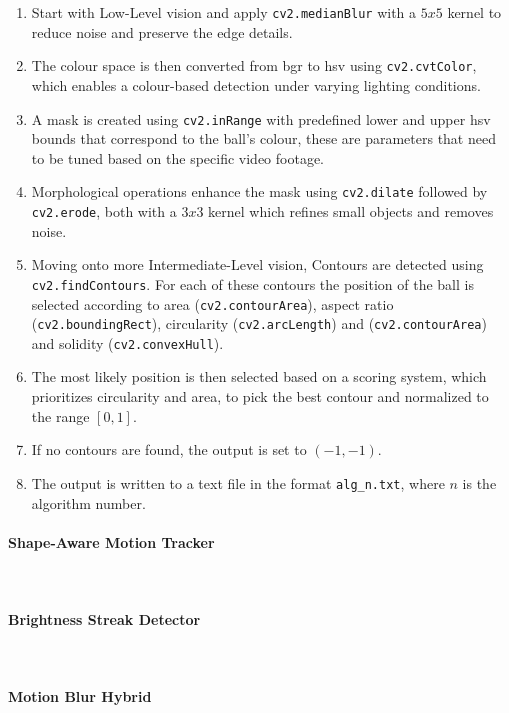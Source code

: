 \documentclass[12pt,a4paper]{article}
\begin{document}
\begin{enumerate}
	\item Start with Low-Level vision and apply \texttt{cv2.medianBlur} with a $5x5$ kernel to reduce noise and preserve the edge details.
	\item The colour space is then converted from \acs{bgr} to \acs{hsv} using \texttt{cv2.cvtColor}, which enables a colour-based detection under varying lighting conditions.
	\item A mask is created using \texttt{cv2.inRange} with predefined lower and upper \acs{hsv} bounds that correspond to the ball's colour, these are parameters that need to be tuned based on the specific video footage.
	\item Morphological operations enhance the mask using \texttt{cv2.dilate} followed by \texttt{cv2.erode}, both with a $3x3$ kernel which refines small objects and removes noise.
	\item Moving onto more Intermediate-Level vision, Contours are detected using \texttt{cv2.findContours}. For each of these contours the position of the ball is selected according to area (\texttt{cv2.contourArea}), aspect ratio (\texttt{cv2.boundingRect}), circularity (\texttt{cv2.arcLength}) and (\texttt{cv2.contourArea}) and solidity (\texttt{cv2.convexHull}).
	\item The most likely position is then selected based on a scoring system, which prioritizes circularity and area, to pick the best contour and normalized to the range $[0,1]$.
	\item If no contours are found, the output is set to $(-1,-1)$.
	\item The output is written to a text file in the format \texttt{alg\_n.txt}, where $n$ is the algorithm number.
\end{enumerate}

\paragraph{Shape-Aware Motion Tracker}
\mbox{}\\

\paragraph{Brightness Streak Detector}
\mbox{}\\

\paragraph{Motion Blur Hybrid}
\mbox{}\\
\end{document}
